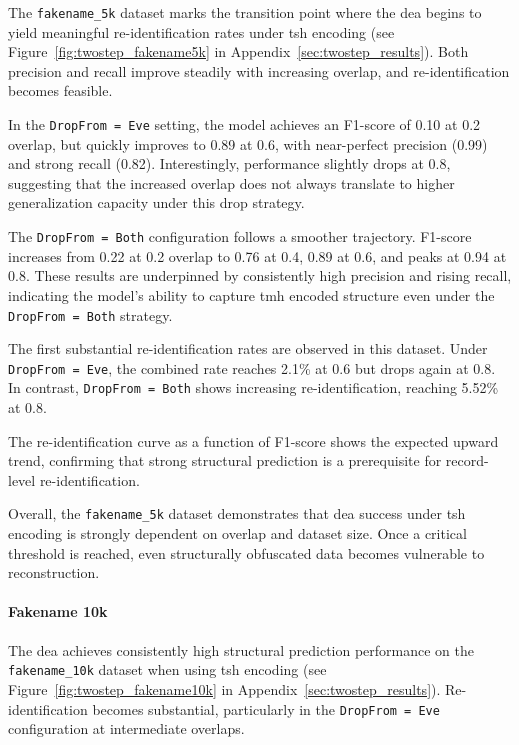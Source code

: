 The \texttt{fakename\_5k} dataset marks the transition point where the \ac{dea} begins to yield meaningful re-identification rates under \ac{tsh} encoding (see Figure~\ref{fig:twostep_fakename5k} in Appendix~\ref{sec:twostep_results}).
Both precision and recall improve steadily with increasing overlap, and re-identification becomes feasible.

In the \texttt{DropFrom = Eve} setting, the model achieves an F1-score of 0.10 at 0.2 overlap, but quickly improves to 0.89 at 0.6, with near-perfect precision (0.99) and strong recall (0.82).
Interestingly, performance slightly drops at 0.8, suggesting that the increased overlap does not always translate to higher generalization capacity under this drop strategy.

The \texttt{DropFrom = Both} configuration follows a smoother trajectory.
F1-score increases from 0.22 at 0.2 overlap to 0.76 at 0.4, 0.89 at 0.6, and peaks at 0.94 at 0.8.
These results are underpinned by consistently high precision and rising recall, indicating the model's ability to capture \ac{tmh} encoded structure even under the \texttt{DropFrom = Both} strategy.

The first substantial re-identification rates are observed in this dataset.
Under \texttt{DropFrom = Eve}, the combined rate reaches 2.1\% at 0.6 but drops again at 0.8.
In contrast, \texttt{DropFrom = Both} shows increasing re-identification, reaching 5.52\% at 0.8.

The re-identification curve as a function of F1-score shows the expected upward trend, confirming that strong structural prediction is a prerequisite for record-level re-identification.



Overall, the \texttt{fakename\_5k} dataset demonstrates that \ac{dea} success under \ac{tsh} encoding is strongly dependent on overlap and dataset size.
Once a critical threshold is reached, even structurally obfuscated data becomes vulnerable to reconstruction.



\paragraph{Fakename 10k}

The \ac{dea} achieves consistently high structural prediction performance on the \texttt{fakename\_10k} dataset when using \ac{tsh} encoding (see Figure~\ref{fig:twostep_fakename10k} in Appendix~\ref{sec:twostep_results}).
Re-identification becomes substantial, particularly in the \texttt{DropFrom = Eve} configuration at intermediate overlaps.

